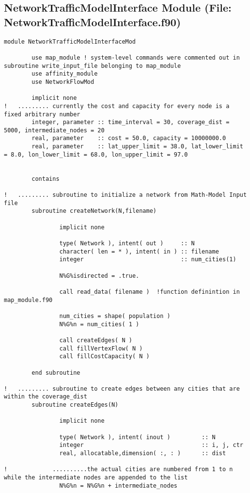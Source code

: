 \documentclass[10pt,a4paper,margin = 1.25cm]{article}
\begin{document}
\subsection*{NetworkTrafficModelInterface Module  (File: NetworkTrafficModelInterface.f90)}
\begin{lstlisting}
module NetworkTrafficModelInterfaceMod
		
		use map_module ! system-level commands were commented out in subroutine write_input_file belonging to map_module
		use affinity_module
		use NetworkFlowMod
		
		implicit none
!   ......... currently the cost and capacity for every node is a fixed arbitrary number		
		integer, parameter :: time_interval = 30, coverage_dist = 5000, intermediate_nodes = 20
		real, parameter    :: cost = 50.0, capacity = 10000000.0
		real, parameter    :: lat_upper_limit = 38.0, lat_lower_limit = 8.0, lon_lower_limit = 68.0, lon_upper_limit = 97.0
   	
		
		contains
		
!   ......... subroutine to initialize a network from Math-Model Input file
		subroutine createNetwork(N,filename)
				
				implicit none
				
				type( Network ), intent( out )     :: N
				character( len = * ), intent( in ) :: filename
				integer                            :: num_cities(1)
				
				N%G%isdirected = .true.
				
				call read_data( filename )  !function definintion in map_module.f90
				
				num_cities = shape( population )	
				N%G%n = num_cities( 1 ) 
				
				call createEdges( N )
				call fillVertexFlow( N )
				call fillCostCapacity( N )
				
		end subroutine
		
!   ......... subroutine to create edges between any cities that are within the coverage_dist
		subroutine createEdges(N)
				
				implicit none
				
				type( Network ), intent( inout )         :: N
				integer                                  :: i, j, ctr
				real, allocatable,dimension( :, : )      :: dist

!			  ..........the actual cities are numbered from 1 to n while the intermediate nodes are appended to the list
				N%G%n = N%G%n + intermediate_nodes
				

\end{lstlisting}
\end{document}

